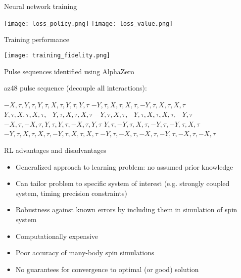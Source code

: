 \documentclass{beamer}
\begin{document}
\begin{frame}{Neural network training}

\texttt{[image: loss\_policy.png]}
\texttt{[image: loss\_value.png]}
\end{frame}

\begin{frame}{Training performance}

\texttt{[image: training\_fidelity.png]}
\end{frame}

\begin{frame}{Pulse sequences identified using AlphaZero}

\textrm{az48} pulse sequence (decouple all interactions):

$ -X, \tau, Y, \tau, Y, \tau, X, \tau, Y, \tau, Y, \tau $
$ -Y, \tau, X, \tau, X, \tau, -Y, \tau, X, \tau, X, \tau $
$ Y, \tau, X, \tau, X, \tau, -Y, \tau, X, \tau, X, \tau $
$ -Y, \tau, X, \tau, -Y, \tau, X, \tau, X, \tau, -Y, \tau $
$ -X, \tau, -X, \tau, Y, \tau, Y, \tau, -X, \tau, Y, \tau $
$ Y, \tau, -Y, \tau, X, \tau, -Y, \tau, -Y, \tau, X, \tau $
$ -Y, \tau, X, \tau, X, \tau, -Y, \tau, X, \tau, X, \tau $
$ -Y, \tau, -X, \tau, -X, \tau, -Y, \tau, -X, \tau, -X, \tau $

\end{frame}

\begin{frame}{RL advantages and disadvantages}

\begin{itemize}
    \item Generalized approach to learning problem: no assumed prior knowledge
    \item Can tailor problem to specific system of interest (e.g. strongly coupled system, timing precision constraints)
    \item Robustness against known errors by including them in simulation of spin system
\end{itemize}

\pause

\begin{itemize}
    \color{red}
    \item Computationally expensive
    \item Poor accuracy of many-body spin simulations
    \item No guarantees for convergence to optimal (or good) solution
\end{itemize}

\end{frame}
\end{document}
